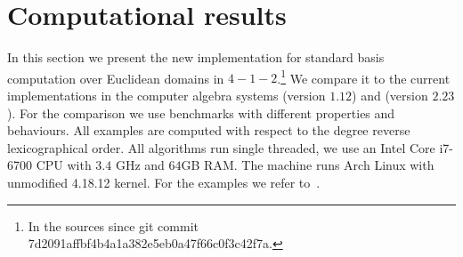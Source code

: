 \section{Computational results}
\label{sec:results}
In this section we present the new implementation for standard basis computation
over Euclidean domains in \singular $4-1-2$.\footnote{In the \singular
sources since git commit 7d2091affbf4b4a1a382e5eb0a47f66c0f3c42f7a.}
We compare it to the current implementations in the
computer algebra systems \macaulay (version $1.12$) and \magma (version $2.23$).
For the comparison we use benchmarks with different properties and behaviours.
All examples are computed with respect to the degree reverse lexicographical order.
All algorithms run single threaded, we use an Intel Core i7-6700 CPU with $3.4$ GHz
and $64$GB RAM. The machine runs Arch Linux with unmodified 4.18.12 kernel. For
the examples we refer to~\cite{singular-benchmarks}.

